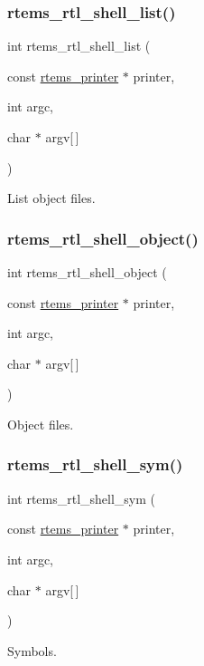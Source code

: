 \subsubsection{\texorpdfstring{rtems\_rtl\_shell\_list()}{rtems\_rtl\_shell\_list()}}
{\footnotesize\ttfamily int rtems\+\_\+rtl\+\_\+shell\+\_\+list (\begin{DoxyParamCaption}\item[{const \mbox{\hyperlink{structrtems__printer}{rtems\+\_\+printer}} $\ast$}]{printer,  }\item[{int}]{argc,  }\item[{char $\ast$}]{argv\mbox{[}$\,$\mbox{]} }\end{DoxyParamCaption})}

List object files. \mbox{\label{rtl-shell_8c_ab9ed5fe1cd6d728c22f423a566b3ec1e}} 
\subsubsection{\texorpdfstring{rtems\_rtl\_shell\_object()}{rtems\_rtl\_shell\_object()}}
{\footnotesize\ttfamily int rtems\+\_\+rtl\+\_\+shell\+\_\+object (\begin{DoxyParamCaption}\item[{const \mbox{\hyperlink{structrtems__printer}{rtems\+\_\+printer}} $\ast$}]{printer,  }\item[{int}]{argc,  }\item[{char $\ast$}]{argv\mbox{[}$\,$\mbox{]} }\end{DoxyParamCaption})}

Object files. \mbox{\label{rtl-shell_8c_a50394981270941b025148ece371a0e5d}} 
\subsubsection{\texorpdfstring{rtems\_rtl\_shell\_sym()}{rtems\_rtl\_shell\_sym()}}
{\footnotesize\ttfamily int rtems\+\_\+rtl\+\_\+shell\+\_\+sym (\begin{DoxyParamCaption}\item[{const \mbox{\hyperlink{structrtems__printer}{rtems\+\_\+printer}} $\ast$}]{printer,  }\item[{int}]{argc,  }\item[{char $\ast$}]{argv\mbox{[}$\,$\mbox{]} }\end{DoxyParamCaption})}

Symbols. 